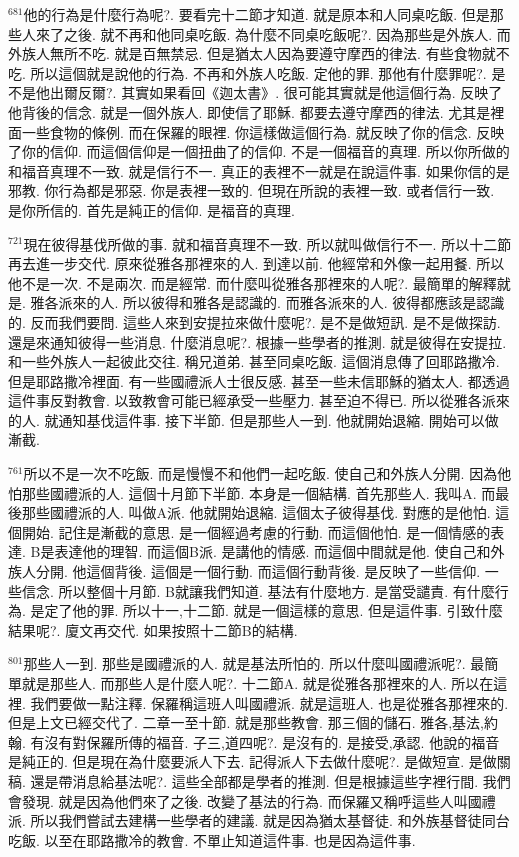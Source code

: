 \documentclass{book}
\begin{document}
$^{681}$他的行為是什麼行為呢?.
要看完十二節才知道.
就是原本和人同桌吃飯.
但是那些人來了之後.
就不再和他同桌吃飯.
為什麼不同桌吃飯呢?.
因為那些是外族人.
而外族人無所不吃.
就是百無禁忌.
但是猶太人因為要遵守摩西的律法.
有些食物就不吃.
所以這個就是說他的行為.
不再和外族人吃飯.
定他的罪.
那他有什麼罪呢?.
是不是他出爾反爾?.
其實如果看回《迦太書》.
很可能其實就是他這個行為.
反映了他背後的信念.
就是一個外族人.
即使信了耶穌.
都要去遵守摩西的律法.
尤其是裡面一些食物的條例.
而在保羅的眼裡.
你這樣做這個行為.
就反映了你的信念.
反映了你的信仰.
而這個信仰是一個扭曲了的信仰.
不是一個福音的真理.
所以你所做的和福音真理不一致.
就是信行不一.
真正的表裡不一就是在說這件事.
如果你信的是邪教.
你行為都是邪惡.
你是表裡一致的.
但現在所說的表裡一致.
或者信行一致.
是你所信的.
首先是純正的信仰.
是福音的真理.

$^{721}$現在彼得基伐所做的事.
就和福音真理不一致.
所以就叫做信行不一.
所以十二節再去進一步交代.
原來從雅各那裡來的人.
到達以前.
他經常和外像一起用餐.
所以他不是一次.
不是兩次.
而是經常.
而什麼叫從雅各那裡來的人呢?.
最簡單的解釋就是.
雅各派來的人.
所以彼得和雅各是認識的.
而雅各派來的人.
彼得都應該是認識的.
反而我們要問.
這些人來到安提拉來做什麼呢?.
是不是做短訊.
是不是做探訪.
還是來通知彼得一些消息.
什麼消息呢?.
根據一些學者的推測.
就是彼得在安提拉.
和一些外族人一起彼此交往.
稱兄道弟.
甚至同桌吃飯.
這個消息傳了回耶路撒冷.
但是耶路撒冷裡面.
有一些國禮派人士很反感.
甚至一些未信耶穌的猶太人.
都透過這件事反對教會.
以致教會可能已經承受一些壓力.
甚至迫不得已.
所以從雅各派來的人.
就通知基伐這件事.
接下半節.
但是那些人一到.
他就開始退縮.
開始可以做漸截.

$^{761}$所以不是一次不吃飯.
而是慢慢不和他們一起吃飯.
使自己和外族人分開.
因為他怕那些國禮派的人.
這個十月節下半節.
本身是一個結構.
首先那些人.
我叫A.
而最後那些國禮派的人.
叫做A派.
他就開始退縮.
這個太子彼得基伐.
對應的是他怕.
這個開始.
記住是漸截的意思.
是一個經過考慮的行動.
而這個他怕.
是一個情感的表達.
B是表達他的理智.
而這個B派.
是講他的情感.
而這個中間就是他.
使自己和外族人分開.
他這個背後.
這個是一個行動.
而這個行動背後.
是反映了一些信仰.
一些信念.
所以整個十月節.
B就讓我們知道.
基法有什麼地方.
是當受譴責.
有什麼行為.
是定了他的罪.
所以十一,十二節.
就是一個這樣的意思.
但是這件事.
引致什麼結果呢?.
廈文再交代.
如果按照十二節B的結構.

$^{801}$那些人一到.
那些是國禮派的人.
就是基法所怕的.
所以什麼叫國禮派呢?.
最簡單就是那些人.
而那些人是什麼人呢?.
十二節A.
就是從雅各那裡來的人.
所以在這裡.
我們要做一點注釋.
保羅稱這班人叫國禮派.
就是這班人.
也是從雅各那裡來的.
但是上文已經交代了.
二章一至十節.
就是那些教會.
那三個的儲石.
雅各,基法,約翰.
有沒有對保羅所傳的福音.
子三,道四呢?.
是沒有的.
是接受,承認.
他說的福音是純正的.
但是現在為什麼要派人下去.
記得派人下去做什麼呢?.
是做短宣.
是做關稿.
還是帶消息給基法呢?.
這些全部都是學者的推測.
但是根據這些字裡行間.
我們會發現.
就是因為他們來了之後.
改變了基法的行為.
而保羅又稱呼這些人叫國禮派.
所以我們嘗試去建構一些學者的建議.
就是因為猶太基督徒.
和外族基督徒同台吃飯.
以至在耶路撒冷的教會.
不單止知道這件事.
也是因為這件事.
\end{document}
